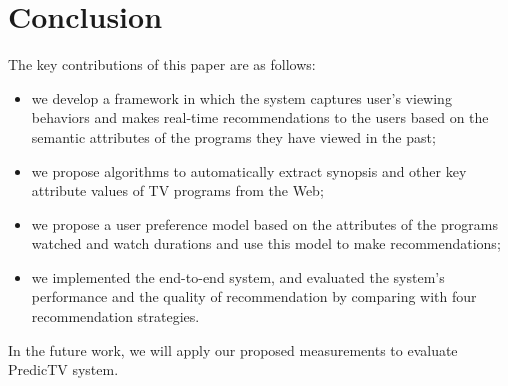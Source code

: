 \section{Conclusion}

The key contributions of this paper are as follows:

\begin{itemize}
\item we develop a framework in which the system captures
user's viewing behaviors and makes real-time recommendations to the users
based on the semantic attributes of the programs they have viewed in the past;
\item we propose algorithms to automatically extract synopsis and other key
attribute values of TV programs from the Web;
\item we propose a user preference model based on the attributes of the
programs watched and watch durations and use this model to make
recommendations;
\item we implemented the end-to-end system, and
evaluated the system's performance and the quality of recommendation by
comparing with four recommendation strategies.
\end{itemize}

In the future work, we will apply our proposed measurements to evaluate PredicTV system.